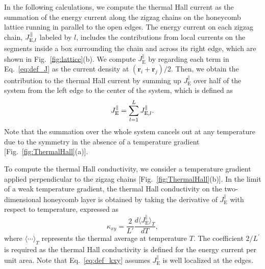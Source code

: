 \documentclass[twocolumn,superscriptaddress,showpacs, longbibliography, aps, prx]{revtex4-2}
\begin{document}
In the following calculations, we compute the thermal Hall current as the summation of the energy current along the zigzag chains on the honeycomb lattice running in parallel to the open edges. 
The energy current on each zigzag chain, $J_{{\rm E},l}^\parallel$ labeled by $l$, includes the contributions from local currents on the segments inside a box surrounding the chain and across its right edge, which are shown in Fig.~\ref{fig:lattice}(b). 
We compute {$J_{\mathrm{E}}^{\parallel}$} by regarding each term in Eq.~\eqref{eq:def_J} as the current density at $(\bm{r}_i + \bm{r}_j)/2$. Then, we obtain the contribution to the thermal Hall current by summing up $J_{\mathrm{E}}^{\parallel}$ over half of the system from the left edge to the center of the system, which is defined as
\begin{align}
J_{\rm E}^\parallel=\sum_{l=1}^{L}J_{{\rm E},l}^\parallel.
\label{eq:JE}
\end{align} 
Note that the summation over the whole system cancels out at any temperature due to the symmetry in the absence of a temperature gradient [Fig.~\ref{fig:ThermalHall}(a)]. 

To compute the thermal Hall conductivity, we consider a temperature gradient applied perpendicular to the zigzag chains [Fig.~\ref{fig:ThermalHall}(b)]. 
In the limit of a weak temperature gradient, the thermal Hall conductivity on the two-dimensional honeycomb layer is obtained by taking the derivative of $J_{\mathrm{E}}^{\parallel}$ with respect to temperature, 
expressed as 
\begin{equation}
 \kappa_{xy}=\frac{2}{L'} \frac{d \langle J_{\mathrm{E}}^{\parallel}\rangle_{T}}{d T},
\label{eq:def_kxy}
\end{equation}
where $\langle \cdots \rangle_T$ represents the thermal average at temperature $T$.
The coefficient $2/L^\prime$ is required as the thermal Hall conductivity is defined for the energy current per unit area. 
Note that Eq.~\eqref{eq:def_kxy} assumes $J_{\mathrm{E}}^\parallel$ is well localized at the edges. 
\end{document}
